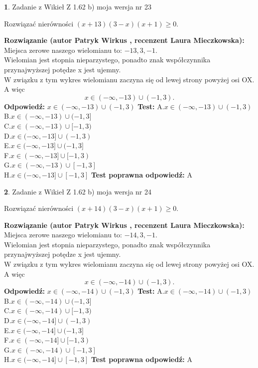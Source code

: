 \documentclass[12pt, a4paper]{article}
\theoremstyle{definition} %
\newtheorem{zad}{}
\newcommand{\zadStart}[1]{\begin{zad}#1\newline}
\newcommand{\zadStop}{\end{zad}}
\newcommand{\rozwStart}[2]{\noindent \textbf{Rozwiązanie (autor #1 , recenzent #2): }\newline}
\newcommand{\rozwStop}{\newline}
\newcommand{\odpStart}{\noindent \textbf{Odpowiedź:}\newline}
\newcommand{\odpStop}{\newline}
\newcommand{\testStart}{\noindent \textbf{Test:}\newline}
\newcommand{\testStop}{\newline}
\newcommand{\kluczStart}{\noindent \textbf{Test poprawna odpowiedź:}\newline}
\newcommand{\kluczStop}{\newline}
\begin{document}
\zadStart{Zadanie z Wikieł Z 1.62 b) moja wersja nr 23}

Rozwiązać nierówności $(x+13)(3-x)(x+1)\ge0$.
\zadStop
\rozwStart{Patryk Wirkus}{Laura Mieczkowska}
Miejsca zerowe naszego wielomianu to: $-13, 3, -1$.\\
Wielomian jest stopnia nieparzystego, ponadto znak współczynnika przy\linebreak najwyższej potędze x jest ujemny.\\ W związku z tym wykres wielomianu zaczyna się od lewej strony powyżej osi OX. A więc $$x \in (-\infty,-13) \cup (-1,3).$$
\rozwStop
\odpStart
$x \in (-\infty,-13) \cup (-1,3)$
\odpStop
\testStart
A.$x \in (-\infty,-13) \cup (-1,3)$\\
B.$x \in (-\infty,-13) \cup (-1,3]$\\
C.$x \in (-\infty,-13) \cup [-1,3)$\\
D.$x \in (-\infty,-13] \cup (-1,3)$\\
E.$x \in (-\infty,-13] \cup (-1,3]$\\
F.$x \in (-\infty,-13] \cup [-1,3)$\\
G.$x \in (-\infty,-13) \cup [-1,3]$\\
H.$x \in (-\infty,-13] \cup [-1,3]$
\testStop
\kluczStart
A
\kluczStop



\zadStart{Zadanie z Wikieł Z 1.62 b) moja wersja nr 24}

Rozwiązać nierówności $(x+14)(3-x)(x+1)\ge0$.
\zadStop
\rozwStart{Patryk Wirkus}{Laura Mieczkowska}
Miejsca zerowe naszego wielomianu to: $-14, 3, -1$.\\
Wielomian jest stopnia nieparzystego, ponadto znak współczynnika przy\linebreak najwyższej potędze x jest ujemny.\\ W związku z tym wykres wielomianu zaczyna się od lewej strony powyżej osi OX. A więc $$x \in (-\infty,-14) \cup (-1,3).$$
\rozwStop
\odpStart
$x \in (-\infty,-14) \cup (-1,3)$
\odpStop
\testStart
A.$x \in (-\infty,-14) \cup (-1,3)$\\
B.$x \in (-\infty,-14) \cup (-1,3]$\\
C.$x \in (-\infty,-14) \cup [-1,3)$\\
D.$x \in (-\infty,-14] \cup (-1,3)$\\
E.$x \in (-\infty,-14] \cup (-1,3]$\\
F.$x \in (-\infty,-14] \cup [-1,3)$\\
G.$x \in (-\infty,-14) \cup [-1,3]$\\
H.$x \in (-\infty,-14] \cup [-1,3]$
\testStop
\kluczStart
A
\kluczStop
\end{document}
